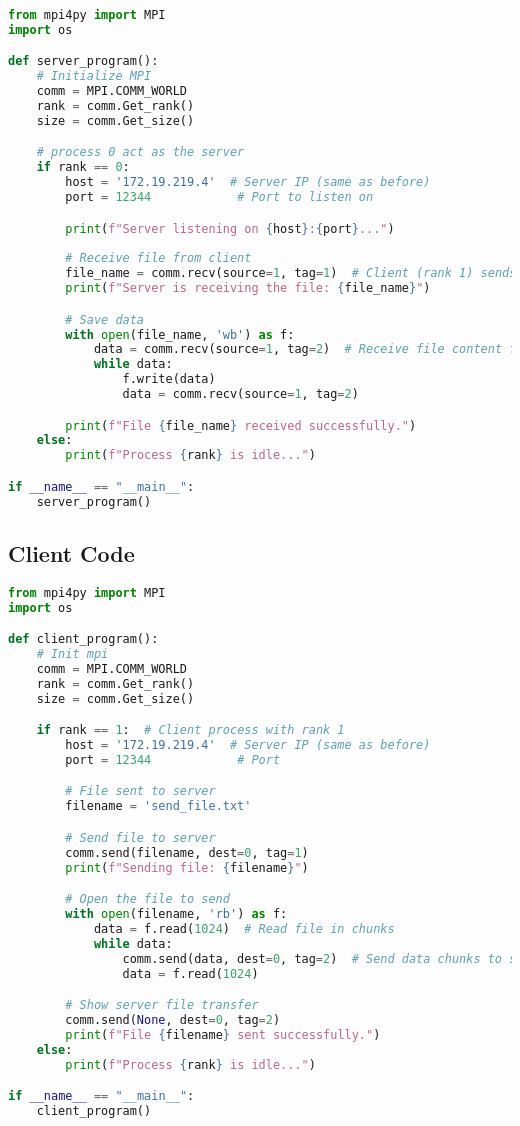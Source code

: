 \documentclass[a4paper,12pt]{article}
\begin{document}
\begin{lstlisting}[language=Python, caption=Server Code using MPI]
from mpi4py import MPI
import os

def server_program():
    # Initialize MPI
    comm = MPI.COMM_WORLD
    rank = comm.Get_rank()
    size = comm.Get_size()

    # process 0 act as the server
    if rank == 0:
        host = '172.19.219.4'  # Server IP (same as before)
        port = 12344            # Port to listen on

        print(f"Server listening on {host}:{port}...")
        
        # Receive file from client
        file_name = comm.recv(source=1, tag=1)  # Client (rank 1) sends file name
        print(f"Server is receiving the file: {file_name}")

        # Save data
        with open(file_name, 'wb') as f:
            data = comm.recv(source=1, tag=2)  # Receive file content from client
            while data:
                f.write(data)
                data = comm.recv(source=1, tag=2)

        print(f"File {file_name} received successfully.")
    else:
        print(f"Process {rank} is idle...")

if __name__ == "__main__":
    server_program()
\end{lstlisting}

\subsection{Client Code}

\begin{lstlisting}[language=Python, caption=Client Code using MPI]
from mpi4py import MPI
import os

def client_program():
    # Init mpi
    comm = MPI.COMM_WORLD
    rank = comm.Get_rank()
    size = comm.Get_size()

    if rank == 1:  # Client process with rank 1
        host = '172.19.219.4'  # Server IP (same as before)
        port = 12344            # Port

        # File sent to server
        filename = 'send_file.txt'

        # Send file to server 
        comm.send(filename, dest=0, tag=1)
        print(f"Sending file: {filename}")

        # Open the file to send
        with open(filename, 'rb') as f:
            data = f.read(1024)  # Read file in chunks
            while data:
                comm.send(data, dest=0, tag=2)  # Send data chunks to server
                data = f.read(1024)

        # Show server file transfer 
        comm.send(None, dest=0, tag=2)
        print(f"File {filename} sent successfully.")
    else:
        print(f"Process {rank} is idle...")

if __name__ == "__main__":
    client_program()
\end{lstlisting}
\end{document}
